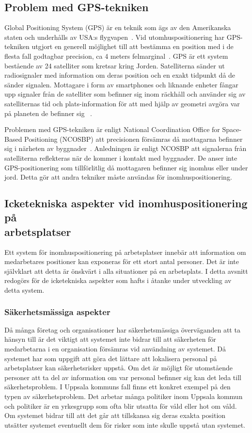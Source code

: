 \documentclass[a4paper,12pt]{article}
\begin{document}
 \subsection{Problem med GPS-tekniken}
 Global Positioning System (GPS) är en teknik som ägs av den Amerikanska staten och underhålls av USA:s flygvapen~\cite{GPS_US_HOW}.
 Vid utomhuspositionering har GPS-tekniken utgjort en generell möjlighet till att bestämma en position med i de flesta fall godtagbar precision, ca 4 meters felmarginal~\cite{GPS_US_ACCURACY}.
 GPS är ett system bestående av 24 satelliter som kretsar kring Jorden. Satelliterna sänder ut radiosignaler med information om deras position och en exakt tidpunkt då de sänder signalen. Mottagare i form av smartphones och liknande enheter fångar upp signaler från de satelliter som befinner sig inom räckhåll och använder sig av satelliternas tid och plats-information för att med hjälp av geometri avgöra var på planeten de befinner sig ~\cite{GPS_US_HOW}.

 Problemen med GPS-tekniken är enligt National Coordination Office for Space-Based Positioning (NCOSBP) att precisionen försämras då mottagarna befinner sig i närheten av byggnader~\cite{GPS_US_ACCURACY}. Anledningen är enligt NCOSBP att signalerna från satelliterna reflekteras när de kommer i kontakt med byggnader. De anser inte GPS-positionering som tillförlitlig då mottagaren befinner sig inomhus eller under jord. Detta gör att andra tekniker måste användas för inomhuspositionering.

 \subsection{Icketekniska aspekter vid inomhuspositionering på \\arbetsplatser}\label{icketekniska_aspekter}
 Ett system för inomhuspositionering på arbetsplatser innebär att information om medarbetares positioner kan exponeras för ett stort antal personer. Det är inte självklart att detta är önskvärt i alla situationer på en arbetsplats. I detta avsnitt redogörs för de icketekniska aspekter som hafts i åtanke under utveckling av detta system.

 \subsubsection{Säkerhetsmässiga aspekter}
 Då många företag och organisationer har säkerhetsmässiga överväganden att ta hänsyn till är det viktigt att systemet inte bidrar till att säkerheten för medarbetarna i en organisation försämras vid användning av systemet.
 Då systemet har som uppgift att göra det lättare att lokalisera personal på arbetsplatser kan säkerhetsrisker uppstå. Om det är möjligt för utomstående personer att ta del av information om var personal befinner sig kan det leda till säkerhetsproblem. I Uppsala kommuns fall finns ett konkret exempel på den typen av säkerhetsproblem. Det arbetar många politiker inom Uppsala kommun och politiker är en yrkesgrupp som ofta blir utsatta för våld eller hot om våld. Om systemet bidrar till att det går att tillskansa sig deras exakta position utsätter systemet eventuellt dem för risker som inte skulle uppstå utan systemet.
\end{document}
